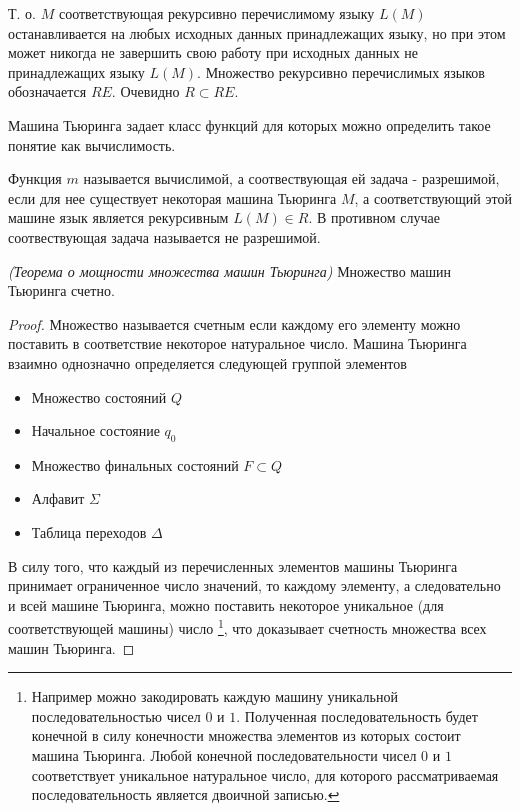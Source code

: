 Т. о. $M$ соответствующая рекурсивно перечислимому языку $L\left(M\right)$ 
останавливается на любых исходных данных принадлежащих языку, но при
этом может никогда не завершить свою работу при исходных данных не
принадлежащих языку $L\left(M\right)$. Множество рекурсивно
перечислимых языков обозначается $RE$. Очевидно  $R \subset RE$.

Машина Тьюринга задает класс функций для которых можно определить
такое понятие как вычислимость. 

\begin{definition}
Функция $m$ называется вычислимой, а соотвествующая ей задача -
разрешимой, если для нее существует некоторая
машина Тьюринга $M$, а соответствующий этой машине язык является
рекурсивным $L\left(M\right) \in R$. В противном случае соотвествующая
задача называется не разрешимой.
\end{definition}

\begin{theorem}
\emph{(Теорема о мощности множества машин Тьюринга)}
Множество машин Тьюринга счетно.
\label{theoremAddAlgoTuringCountability}
\end{theorem}

\begin{proof}
Множество называется счетным если каждому его элементу можно поставить
в соответствие некоторое натуральное число. 
Машина Тьюринга взаимно однозначно определяется следующей группой элементов
\begin{itemize}
\item Множество состояний $Q$
\item Начальное состояние $q_0$
\item Множество финальных состояний $F \subset Q$
\item Алфавит $\Sigma$
\item Таблица переходов $\Delta$
\end{itemize}

В силу того, что каждый из перечисленных элементов машины Тьюринга
принимает ограниченное число значений, то каждому элементу, а
следовательно и всей машине Тьюринга, можно поставить некоторое
уникальное (для соответствующей машины) число
\footnote{
Например можно закодировать каждую машину уникальной
последовательностью чисел $0$ и $1$. Полученная последовательность
будет конечной в силу конечности множества элементов из которых
состоит машина Тьюринга. Любой конечной последовательности чисел $0$ и
$1$ соответствует уникальное натуральное число, для которого
рассматриваемая последовательность является двоичной записью. 
}, что доказывает счетность
множества всех машин Тьюринга.
\end{proof}

